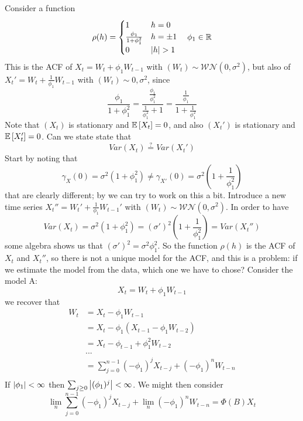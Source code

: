 \begin{example}
    Consider a function
    \[
        \rho(h)=\begin{cases}
            1&h=0\\
            \frac{\phi_1}{1+\phi_1^2}&h=\pm1\\
            0&\abs{h}>1\\
        \end{cases}\ \ \ \phi_1\in\R
    \]
    This is the ACF of $X_t=W_t+\phi_1W_{t-1}$ with $(W_t)\sim\mathcal{WN}(0,\sigma^2)$, but also of $X_t'=W_t+\frac{1}{\phi_1}W_{t-1}$ with $(W_t)\sim\mathcal{0,\sigma^2}$, since
    \[
        \frac{\phi_1}{1+\phi_1^2}=\frac{\frac{\phi_1}{\phi_1^2}}{\frac{1}{\phi_1^2}+1}=\frac{\frac{1}{\phi_1}}{1+\frac{1}{\phi_1^2}}    
    \]
    Note that $(X_t)$ is stationary and $\mathbb{E}\left[X_t\right]=0$, and also $(X_t')$ is stationary and $\mathbb{E}\left[X_t'\right]=0$. Can we state state that
    \[
        Var(X_t)\stackrel{?}{=}Var(X_t')  
    \]
    Start by noting that
    \[
        \gamma_X(0)=\sigma^2(1+\phi_1^2)\ne\gamma_{X'}(0)=\sigma^2(1+\frac{1}{\phi_1^2})
    \]
    that are clearly different; by we can try to work on this a bit. Introduce a new time series $X_t''=W_t'+\frac{1}{\phi_1}W_{t-1}'$ with $(W_t)\sim\mathcal{WN}(0,\sigma^2)$. In order to have
    \[
        Var(X_t)=\sigma^2(1+\phi_1^2)=(\sigma')^2(1+\frac{1}{\phi_1^2})=Var(X_t'')    
    \]
    some algebra shows us that $(\sigma')^2=\sigma^2\phi_1^2$. So the function $\rho(h)$ is the ACF of $X_t$ and $X_t''$, so there is not a unique model for the ACF, and this is a problem: if we estimate the model from the data, which one we have to chose? Consider the model A:
    \[
        X_t=W_t+\phi_1W_{t-1}  
    \]
    we recover that
    \begin{equation*}
        \begin{split}
            W_t&=X_t-\phi_1W_{t-1}\\
            &=X_t-\phi_1(X_{t-1}-\phi_1W_{t-2})\\
            &=X_t-\phi_{t-1}+\phi_1^2{W_{t-2}}\\
            &...\\
            &=\sum_{j=0}^{n-1}(-\phi_1)^jX_{t-j}+(-\phi_1)^nW_{t-n}\\
        \end{split}
    \end{equation*}
    If $\left|\phi_1\right|<\infty$ then $\sum_{j\ge0}\left|(\phi_1)^j\right|<\infty$. We might then consider
    \[
        \lim_n\sum_{j=0}^{n-1}(-\phi_1)^jX_{t-j}+\lim_n(-\phi_1)^nW_{t-n}=\Phi(B)X_t
\]
\end{example}
